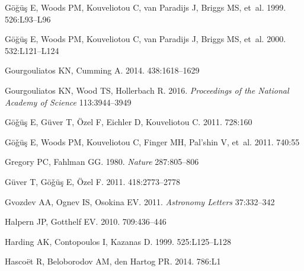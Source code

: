 \documentclass[letterpaper]{ar-1col}
\begin{document}
\begin{thebibliography}{}
{G{\"o}{\u g}{\"u}{\c s}} E, {Woods} PM, {Kouveliotou} C, {van Paradijs} J,
  {Briggs} MS, et~al. 1999.
\textit{\apj} 526:L93--L96

{G{\"o}{\u g}{\"u}{\c s}} E, Woods PM, Kouveliotou C, van Paradijs J, Briggs
  MS, et~al. 2000.
\textit{\apj} 532:L121--L124

{Gourgouliatos} KN, {Cumming} A. 2014.
\textit{\mnras} 438:1618--1629

{Gourgouliatos} KN, {Wood} TS, {Hollerbach} R. 2016.
\textit{Proceedings of the National Academy of Science} 113:3944--3949

{G{\"o}{\v g}{\"u}{\c s}} E, {G{\"u}ver} T, {{\"O}zel} F, {Eichler} D,
  {Kouveliotou} C. 2011{}.
\textit{\apj} 728:160

{G{\"o}{\v g}{\"u}{\c s}} E, {Woods} PM, {Kouveliotou} C, {Finger} MH,
  {Pal'shin} V, et~al. 2011{}.
\textit{\apj} 740:55

{Gregory} PC, {Fahlman} GG. 1980.
\textit{Nature} 287:805--806

{G{\"u}ver} T, {G{\"o}{\v g}{\"u}{\c s}} E, {{\"O}zel} F. 2011.
\textit{\mnras} 418:2773--2778

{Gvozdev} AA, {Ognev} IS, {Osokina} EV. 2011.
\textit{Astronomy Letters} 37:332--342

{Halpern} JP, {Gotthelf} EV. 2010.
\textit{\apj} 709:436--446

Harding AK, Contopoulos I, Kazanas D. 1999.
\textit{\apj} 525:L125--L128

{Hasco{\"e}t} R, {Beloborodov} AM, {den Hartog} PR. 2014.
\textit{\apjl} 786:L1


\end{thebibliography}
\end{document}
